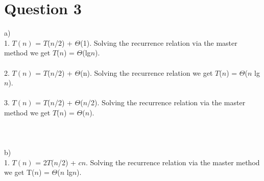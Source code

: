\documentclass[12pt]{article}
\begin{document}
\section*{Question 3}
a)\\ 
1. $T(n)$ = $T$($n$/2) + $\Theta$(1). Solving the recurrence relation via the master method we get $T$($n$) = $\Theta$(lg$n$).  \\\\
2. $T(n)$ = $T$($n$/2) + $\Theta$(n). Solving the recurrence relation we get $T$($n$) = $\Theta$($n$ lg$n$).\\\\ 
3. $T(n)$ = $T$($n$/2) + $\Theta$($n$/2). Solving the recurrence relation via the master method we get $T$($n$) = $\Theta$($n$).\\\\\\\\
b) \\ 
1. $T(n)$ = 2$T$($n$/2) + $cn$. Solving the recurrence relation via the master method we get T($n$) = $\Theta$($n$ lg$n$). \\\\ 
\end{document}
